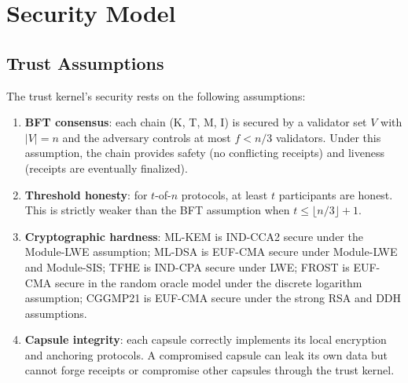 

\section{Security Model}
\label{sec:security}

\subsection{Trust Assumptions}

The trust kernel's security rests on the following assumptions:

\begin{enumerate}
    \item \textbf{BFT consensus}: each chain (K, T, M, I) is secured by a
          validator set $V$ with $|V| = n$ and the adversary controls at most
          $f < n/3$ validators. Under this assumption, the chain provides
          safety (no conflicting receipts) and liveness (receipts are eventually
          finalized).
    \item \textbf{Threshold honesty}: for $t$-of-$n$ protocols, at least $t$
          participants are honest. This is strictly weaker than the BFT
          assumption when $t \leq \lfloor n/3 \rfloor + 1$.
    \item \textbf{Cryptographic hardness}: ML-KEM is IND-CCA2 secure under the
          Module-LWE assumption; ML-DSA is EUF-CMA secure under Module-LWE and
          Module-SIS; TFHE is IND-CPA secure under LWE; FROST is EUF-CMA
          secure in the random oracle model under the discrete logarithm
          assumption; CGGMP21 is EUF-CMA secure under the strong RSA and DDH
          assumptions.
    \item \textbf{Capsule integrity}: each capsule correctly implements its
          local encryption and anchoring protocols. A compromised capsule can
          leak its own data but cannot forge receipts or compromise other
          capsules through the trust kernel.
\end{enumerate}

